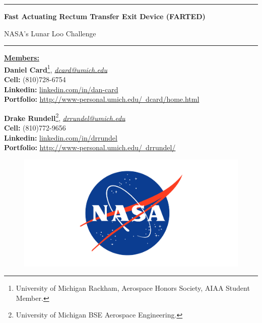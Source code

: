 \thispagestyle{empty}
    
\rule{\textwidth}{3pt}

\vspace{1cm}
\textbf{\LARGE{Fast Actuating Rectum Transfer Exit} Device (FARTED)}

\bigskip

NASA's Lunar Loo Challenge

\rule{\textwidth}{1pt}

\vspace{1cm}
\begin{flushleft}
    \underline{\textbf{\LARGE{Members:}}}\\
    \textbf{Daniel Card}\footnote{University of Michigan Rackham, Aerospace Honors Society, AIAA Student Member.}, \href{mailto:dcard@umich.edu}{\textit{dcard@umich.edu}}\\
    \textbf{Cell:} (810)728-6754\\
    \textbf{Linkedin:} \href{http://www.linkedin.com/in/dan-card}{linkedin.com/in/dan-card}\\
    \textbf{Portfolio:}  \href{http://www-personal.umich.edu/~dcard/home.html}{http://www-personal.umich.edu/~dcard/home.html}

    \bigskip
    \textbf{Drake Rundell}\footnote{University of Michigan BSE Aerospace Engineering.}, \href{mailto:drrundel}{\textit{drrundel@umich.edu}}\\
    \textbf{Cell:} (810)772-9656\\
    \textbf{Linkedin:} \href{http://www.linkedin.com/in/drrundel}{linkedin.com/in/drrundel}\\
    \textbf{Portfolio:}  \href{http://www-personal.umich.edu/~drrundel/}{http://www-personal.umich.edu/~drrundel/}
\end{flushleft}

\begin{figure}[h]
    \centering
    \includegraphics[width = \linewidth]{administrative/nasa-logo-web-rgb.png}
\end{figure}

\vfill
